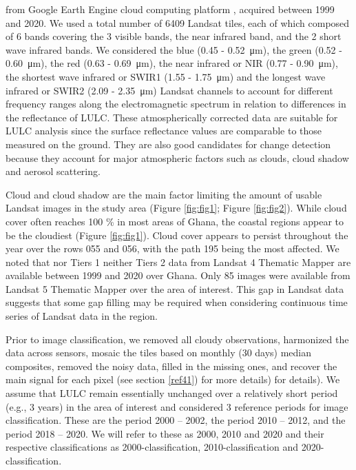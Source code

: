 \documentclass[12pt,oneside,preprint,3p,authoryear,times]{elsarticle} %
\begin{document}
\noindent from Google Earth Engine cloud computing platform
\citep{Gorelick-et-al-2017, Wulder-et-al-2019}, acquired between 1999
and 2020. We used a total number of 6409 Landsat tiles, each of which
composed of 6 bands covering the 3 visible bands, the near infrared
band, and the 2 short wave infrared bands. We considered the blue (0.45
- \SI{0.52}{\micro\metre}), the green (0.52 - \SI{0.60}{\micro\metre}),
the red (0.63 - \SI{0.69}{\micro\metre}), the near infrared or NIR (0.77
- \SI{0.90}{\micro\metre}), the shortest wave infrared or SWIR1 (1.55 -
\SI{1.75}{\micro\metre}) and the longest wave infrared or SWIR2 (2.09 -
\SI{2.35}{\micro\metre}) Landsat channels to account for different
frequency ranges along the electromagnetic spectrum in relation to
differences in the reflectance of LULC. These atmospherically corrected
data are suitable for LULC analysis since the surface reflectance values
are comparable to those measured on the ground. They are also good
candidates for change detection because they account for major
atmospheric factors such as clouds, cloud shadow and aerosol scattering.

Cloud and cloud shadow are the main factor limiting the amount of usable
Landsat images in the study area (Figure \ref{fig:fig1}; Figure
\ref{fig:fig2}). While cloud cover often reaches 100 \% in most areas of
Ghana, the coastal regions appear to be the cloudiest (Figure
\ref{fig:fig1}). Cloud cover appears to persist throughout the year over
the rows 055 and 056, with the path 195 being the most affected. We
noted that nor Tiers 1 neither Tiers 2 data from Landsat 4 Thematic
Mapper are available between 1999 and 2020 over Ghana. Only 85 images
were available from Landsat 5 Thematic Mapper over the area of interest.
This gap in Landsat data suggests that some gap filling may be required
when considering continuous time series of Landsat data in the region.

Prior to image classification, we removed all cloudy observations,
harmonized the data across sensors, mosaic the tiles based on monthly
(30 days) median composites, removed the noisy data, filled in the
missing ones, and recover the main signal for each pixel (see section
\ref{ref41}) for more details) for details). We assume that LULC remain
essentially unchanged over a relatively short period (e.g., 3 years) in
the area of interest and considered 3 reference periods for image
classification. These are the period 2000 -- 2002, the period 2010 --
2012, and the period 2018 -- 2020. We will refer to these as 2000, 2010
and 2020 and their respective classifications as 2000-classification,
2010-classification and 2020-classification.
\end{document}
